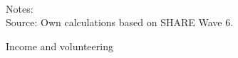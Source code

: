 \documentclass[10pt, letterpaper]{article}
\begin{document}
\begin{spacing}{1.4}
\begin{spacing}{.9}
%	 
%
%
%	 


\begin{figure}[H]
\centering
\caption{Income and volunteering} 
\label{fig:casp_ols}
\begin{minipage}{1\linewidth}
\quad
{}~\\ 
{\footnotesize Notes: }~\\
{\footnotesize Source: Own calculations based on SHARE Wave 6.}
\end{minipage}
\end{figure} 



\end{spacing}
\end{spacing}
\end{document}
